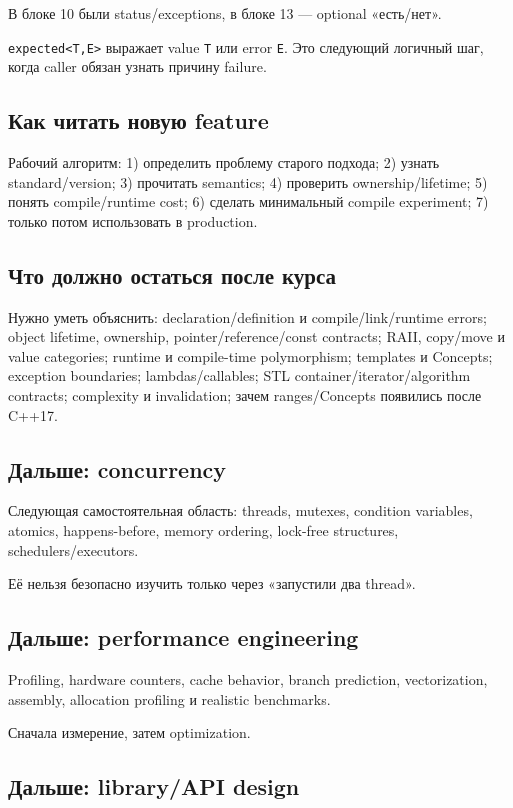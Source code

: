 В блоке 10 были status/exceptions, в блоке 13 --- optional «есть/нет».

\texttt{expected<T,E>} выражает value \texttt{T} или error \texttt{E}. Это
следующий логичный шаг, когда caller обязан узнать причину failure.

\subsection{Как читать новую feature}

Рабочий алгоритм:
1) определить проблему старого подхода; 2) узнать standard/version; 3) прочитать semantics; 4) проверить ownership/lifetime; 5) понять compile/runtime cost; 6) сделать минимальный compile experiment; 7) только потом использовать в production.

\subsection{Что должно остаться после курса}

Нужно уметь объяснить:
declaration/definition и compile/link/runtime errors; object lifetime, ownership, pointer/reference/const contracts; RAII, copy/move и value categories; runtime и compile-time polymorphism; templates и Concepts; exception boundaries; lambdas/callables; STL container/iterator/algorithm contracts; complexity и invalidation; зачем ranges/Concepts появились после C++17.

\subsection{Дальше: concurrency}

Следующая самостоятельная область:
threads, mutexes, condition variables, atomics, happens-before, memory ordering,
lock-free structures, schedulers/executors.

Её нельзя безопасно изучить только через «запустили два thread».

\subsection{Дальше: performance engineering}

Profiling, hardware counters, cache behavior, branch prediction, vectorization,
assembly, allocation profiling и realistic benchmarks.

Сначала измерение, затем optimization.

\subsection{Дальше: library/API design}

